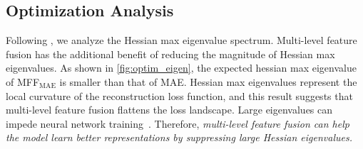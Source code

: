 \subsection{Optimization Analysis}
\label{sec:optim_ana}

Following \cite{howdo}, we analyze the Hessian max eigenvalue spectrum. Multi-level feature fusion has the additional benefit of reducing the magnitude of Hessian max eigenvalues. As shown in \autoref{fig:optim_eigen}, the expected hessian max eigenvalue of MFF$_\text{MAE}$ is smaller than that of MAE\cite{MAE}. Hessian max eigenvalues represent the local curvature of the reconstruction loss function, and this result suggests that multi-level feature fusion flattens the loss landscape. Large eigenvalues can impede neural network training~\cite{ghorbani2019investigation}. Therefore, \textit{multi-level feature fusion can help the model learn better representations by suppressing large Hessian eigenvalues.}

